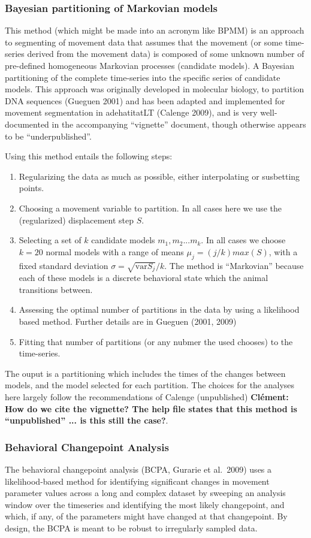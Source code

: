 \documentclass[10pt]{article}\usepackage{graphicx, color}
\newcommand{\ben}{\begin{enumerate}}
\newcommand{\een}{\end{enumerate}}
\newcommand{\I}{\item}
\begin{document}
\subsubsection{Bayesian partitioning of Markovian models}

This method (which might be made into an acronym like BPMM) is an approach to segmenting of movement data that assumes that the movement (or some time-series derived from the movement data) is composed of some unknown number of pre-defined homogeneous Markovian processes (candidate models).  A Bayesian partitioning of the complete time-series into the specific series of candidate models. This approach was originally developed in molecular biology, to partition DNA sequences (Gueguen 2001) and has been adapted and implemented for movement segmentation in adehatitatLT (Calenge 2009), and is very well-documented in the accompanying ``vignette'' document, though otherwise appears to be ``underpublished''.  

Using this method entails the following steps:

\ben
\I Regularizing the data as much as possible, either interpolating or susbetting points. 
\I Choosing a movement variable to partition.  In all cases here we use the (regularized) displacement step $S$.  
\I Selecting a set of $k$ candidate models $m_1, m_2  ... m_k$.  In all cases we choose $k=20$ normal models with a range of means $\mu_j = (j/k) max(S)$, with a fixed standard deviation $\sigma = \sqrt{\text{var}{S_j}} / k$.  The method is ``Markovian'' because each of these models is a discrete behavioral state which the animal transitions between.  
\I Assessing the optimal number of partitions in the data by using a likelihood based method.  Further details are in Gueguen (2001, 2009)
\I Fitting that number of partitions (or any nubmer the used chooses) to the time-series.
\een

The ouput is a partitioning which includes the times of the changes between models, and the model selected for each partition.   The choices for the analyses here largely follow the recommendations of Calenge (unpublished) {\bf Cl\'ement: How do we cite the vignette?  The help file states that this method is ``unpublished'' ... is this still the case?}.


\subsubsection{Behavioral Changepoint Analysis}

The behavioral changepoint analysis (BCPA, Gurarie et al.~2009) uses a likelihood-based method for identifying significant changes in movement parameter values across a long and complex dataset by sweeping an analysis window over the timeseries and identifying the most likely changepoint, and which, if any, of the parameters might have changed at that changepoint.  By design, the BCPA is meant to be robust to irregularly sampled data.  
\end{document}
